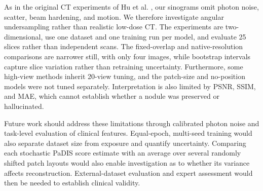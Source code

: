 As in the original CT experiments of Hu et al. \cite{hu_learning_2024}, our sinograms omit photon noise, scatter, beam hardening, and motion. We therefore investigate angular undersampling rather than realistic low-dose CT. The experiments are two-dimensional, use one dataset and one training run per model, and evaluate 25 slices rather than independent scans. The fixed-overlap and native-resolution comparisons are narrower still, with only four images, while bootstrap intervals capture slice variation rather than retraining uncertainty. Furthermore, some high-view methods inherit 20-view tuning, and the patch-size and no-position models were not tuned separately. Interpretation is also limited by PSNR, SSIM, and MAE, which cannot establish whether a nodule was preserved or hallucinated.

Future work should address these limitations through calibrated photon noise and task-level evaluation of clinical features. Equal-epoch, multi-seed training would also separate dataset size from exposure and quantify uncertainty. Comparing each stochastic PaDIS score estimate with an average over several randomly shifted patch layouts would also enable investigation as to whether its variance affects reconstruction. External-dataset evaluation and expert assessment would then be needed to establish clinical validity.
